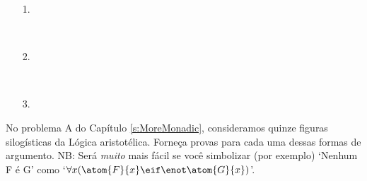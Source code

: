 \begin{itemize}
\item[1.] \begin{fitchproof}
	\open
	\close
{} {}
\end{fitchproof}

\item[] \

\item[2.] \begin{fitchproof}
 {}
 {}
\end{fitchproof}

\item[] \ 

\item[3.] \begin{fitchproof}
\open
\close
{}
\end{fitchproof}
\end{itemize}
 
\problempart
\label{pr.BarbaraEtc.proof1}
No problema A do Capítulo  \ref{s:MoreMonadic}, consideramos quinze figuras silog\'isticas da L\'ogica aristot\'elica. Forne\c ca provas para cada uma dessas formas de argumento. NB: Ser\'a \emph{muito} mais f\'acil se voc\^e simbolizar (por exemplo) `Nenhum F \'e G' como `$\forall x (\atom{F}{x} \eif \enot \atom{G}{x})$'.

